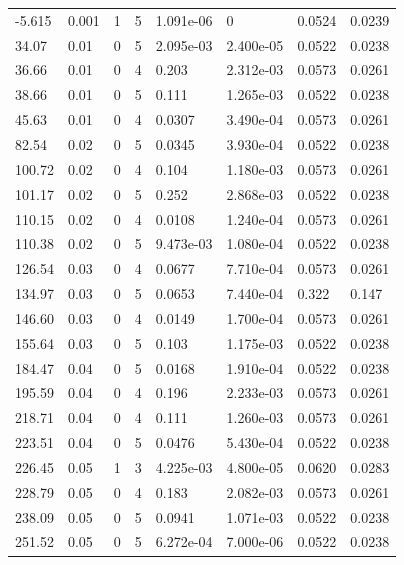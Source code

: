 \documentclass[preview]{standalone}
\begin{document}
{{\begin{tabular}{L{1.2cm}C{1.2cm} C{0.3cm}C{0.5cm} C{1.4cm}C{1.4cm} C{1.4cm}C{1.4cm}}
  -5.615  &  0.001  & 1     &  5 &  1.091e-06  & 0  & 0.0524 &  0.0239   \\ 
  34.07  &  0.01  & 0     &  5 &  2.095e-03  & 2.400e-05  & 0.0522 &  0.0238   \\ 
  36.66  &  0.01  & 0     &  4 &  0.203  & 2.312e-03  & 0.0573 &  0.0261   \\ 
  38.66  &  0.01  & 0     &  5 &  0.111  & 1.265e-03  & 0.0522 &  0.0238   \\ 
  45.63  &  0.01  & 0     &  4 &  0.0307  & 3.490e-04  & 0.0573 &  0.0261   \\ 
  82.54  &  0.02  & 0     &  5 &  0.0345  & 3.930e-04  & 0.0522 &  0.0238   \\ 
  100.72  &  0.02  & 0     &  4 &  0.104  & 1.180e-03  & 0.0573 &  0.0261   \\ 
  101.17  &  0.02  & 0     &  5 &  0.252  & 2.868e-03  & 0.0522 &  0.0238   \\ 
  110.15  &  0.02  & 0     &  4 &  0.0108  & 1.240e-04  & 0.0573 &  0.0261   \\ 
  110.38  &  0.02  & 0     &  5 &  9.473e-03  & 1.080e-04  & 0.0522 &  0.0238   \\ 
  126.54  &  0.03  & 0     &  4 &  0.0677  & 7.710e-04  & 0.0573 &  0.0261   \\ 
  134.97  &  0.03  & 0     &  5 &  0.0653  & 7.440e-04  & 0.322 &  0.147   \\ 
  146.60  &  0.03  & 0     &  4 &  0.0149  & 1.700e-04  & 0.0573 &  0.0261   \\ 
  155.64  &  0.03  & 0     &  5 &  0.103  & 1.175e-03  & 0.0522 &  0.0238   \\ 
  184.47  &  0.04  & 0     &  5 &  0.0168  & 1.910e-04  & 0.0522 &  0.0238   \\ 
  195.59  &  0.04  & 0     &  4 &  0.196  & 2.233e-03  & 0.0573 &  0.0261   \\ 
  218.71  &  0.04  & 0     &  4 &  0.111  & 1.260e-03  & 0.0573 &  0.0261   \\ 
  223.51  &  0.04  & 0     &  5 &  0.0476  & 5.430e-04  & 0.0522 &  0.0238   \\ 
  226.45  &  0.05  & 1     &  3 &  4.225e-03  & 4.800e-05  & 0.0620 &  0.0283   \\ 
  228.79  &  0.05  & 0     &  4 &  0.183  & 2.082e-03  & 0.0573 &  0.0261   \\ 
  238.09  &  0.05  & 0     &  5 &  0.0941  & 1.071e-03  & 0.0522 &  0.0238   \\ 
  251.52  &  0.05  & 0     &  5 &  6.272e-04  & 7.000e-06  & 0.0522 &  0.0238   \\ 

\end{tabular}}}
\end{document}
